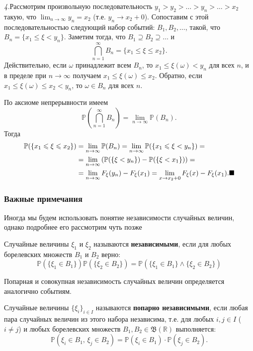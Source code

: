 \textit{4.}Рассмотрим произвольную последовательность $y_1 > y_2 > \ldots > y_n > \ldots > x_2$ такую, что $\lim_{n \to \infty} y_n = x_2$ (т.е. $y_n \to x_2+0$). Сопоставим с этой последовательностью следующий набор событий: $B_1, B_2, \ldots$, такой, что $B_n = \{x_1 \leqslant \xi < y_n\}$. Заметим тогда, что $B_1 \supseteq B_2 \supseteq \ldots$ и
\[
\bigcap_{n=1}^{\infty} B_n = \{x_1 \leqslant \xi \leqslant x_2\}.
\]
Действительно, если $\omega$ принадлежит всем $B_n$, то $x_1 \leqslant \xi(\omega) < y_n$ для всех $n$, и в пределе при $n \to \infty$ получаем $x_1 \leqslant \xi(\omega) \leqslant x_2$. Обратно, если $x_1 \leqslant \xi(\omega) \leqslant x_2 < y_n$, то $\omega \in B_n$ для всех $n$.

По аксиоме непрерывности имеем
\[
\mathbb{P}\!\left(\bigcap_{n=1}^{\infty} B_n\right) = \lim_{n \to \infty} \mathbb{P}(B_n).
\]
Тогда
\begin{align*}
\mathbb{P}(\{x_1 \leqslant \xi \leqslant x_2\}) &= \lim_{n \to \infty} \mathbb{P}(B_n) = \lim_{n \to \infty} \mathbb{P}(\{x_1 \leqslant \xi < y_n\}) = \\
&= \lim_{n \to \infty} \left(\mathbb{P}(\{\xi < y_n\}) - \mathbb{P}(\{\xi < x_1\})\right) = \\
&= \lim_{n \to \infty} F_{\xi}(y_n) - F_{\xi}(x_1) = \lim_{x \to x_2+0} F_{\xi}(x) - F_{\xi}(x_1). \hfill \blacksquare
\end{align*}

\subsubsection{Важные примечания}

Иногда мы будем использовать понятие независимости случайных величин, однако подробнее его рассмотрим чуть позже

\begin{definition} Случайные величины \(\xi_1\) и \(\xi_2\) называются \textbf{независимыми}, если для любых борелевских множеств \(B_1\) и \(B_2\) верно:
\[
\mathbb{P}(\{\xi_1 \in B_1\}) \mathbb{P}(\{\xi_2 \in B_2\}) = \mathbb{P}(\{\xi_1 \in B_1\} \wedge \{\xi_2 \in B_2\})
\]
\end{definition}

Попарная и совокупная независимость случайных величин определяется аналогично событиям.\\

\begin{definition}
Случайные величины $\{\xi_i\}_{i \in I}$ называются \textbf{попарно независимыми}, если любая пара случайных величин из этого набора независима, т.е. для любых $i, j \in I$ ($i \neq j$) и любых борелевских множеств $B_1, B_2 \in \mathfrak{B}(\mathbb{R})$ выполняется:
\[
\mathbb{P}(\xi_i \in B_1, \, \xi_j \in B_2) = \mathbb{P}(\xi_i \in B_1) \cdot \mathbb{P}(\xi_j \in B_2).
\]
\end{definition}

